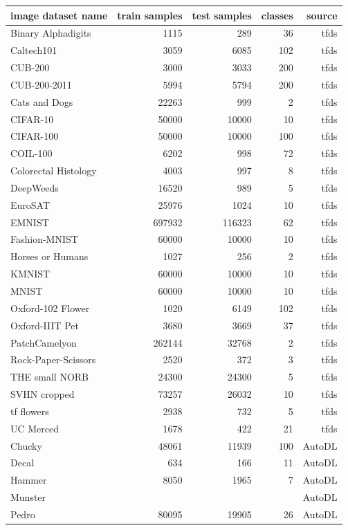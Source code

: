 \documentclass{article}
\begin{document}
\begin{table}
\center
\tiny 
\begin{tabular}{|l|r|r|r|r|}
\hline
image dataset name & train samples & test samples & classes & source \\
\hline
Binary Alphadigits & 1115 & 289 & 36 & tfds \\
Caltech101 & 3059 & 6085 & 102 & tfds \\
CUB-200 & 3000 & 3033 & 200 & tfds \\
CUB-200-2011 & 5994 & 5794 & 200 & tfds \\
Cats and Dogs & 22263 & 999 & 2 & tfds \\
CIFAR-10 & 50000 & 10000 & 10 & tfds \\
CIFAR-100 & 50000 & 10000 & 100 & tfds \\
COIL-100 & 6202 & 998 & 72 & tfds \\
Colorectal Histology & 4003 & 997 & 8 & tfds \\
DeepWeeds & 16520 & 989 & 5 & tfds \\
EuroSAT & 25976 & 1024 & 10 & tfds \\
EMNIST & 697932 & 116323 & 62 & tfds \\
Fashion-MNIST & 60000 & 10000 & 10 & tfds \\
Horses or Humans & 1027 & 256 & 2 & tfds \\
KMNIST & 60000 & 10000 & 10 & tfds \\
MNIST & 60000 & 10000 & 10 & tfds \\
Oxford-102 Flower & 1020 & 6149 & 102 & tfds \\
Oxford-IIIT Pet & 3680 & 3669 & 37 & tfds \\
PatchCamelyon & 262144 & 32768 & 2 & tfds \\
Rock-Paper-Scissors & 2520 & 372 & 3 & tfds \\
THE small NORB & 24300 & 24300 & 5 & tfds \\
SVHN cropped & 73257 & 26032 & 10 & tfds \\
tf flowers & 2938 & 732 & 5 & tfds \\
UC Merced & 1678 & 422 & 21 & tfds \\
Chucky & 48061 & 11939 & 100 & AutoDL \\
Decal & 634 & 166 & 11 & AutoDL \\
Hammer & 8050 & 1965 & 7 & AutoDL \\
Munster & & & & AutoDL \\
Pedro & 80095 & 19905 & 26 & AutoDL\\

\end{tabular}
\end{table}
\end{document}
